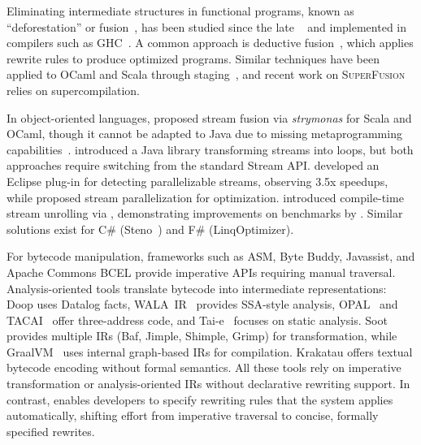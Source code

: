 
Eliminating intermediate structures in functional programs, known as ``deforestation'' or fusion~\citep{hirzel2014catalog}, has been studied since the late ~\citep{wadler1990deforestation} and implemented in compilers such as GHC~\citep{gill1993fusion}.
A common approach is deductive fusion~\citep{bird1989calculation,meijer1991bananas,chin1992fusion,takano1995deforestation,bird1997algebra,hamilton2002deforestation,coutts2007,hinze2011fusion}, which applies rewrite rules to produce optimized programs.
Similar techniques have been applied to OCaml and Scala through staging~\citep{kiselyov2017}, and recent work on \textsc{SuperFusion}~\citep{ji2024superfusion} relies on supercompilation.

In object-oriented languages, \citet{kiselyov2017} proposed stream fusion via \textit{strymonas} for Scala and OCaml, though it cannot be adapted to Java due to missing metaprogramming capabilities~\citep{kiselyov2024complete}.
\citet{ribeiro2018java} introduced a Java library transforming streams into loops, but both approaches require switching from the standard Stream API.
\citet{khatchadourian2020safe} developed an Eclipse plug-in for detecting parallelizable streams, observing 3.5x speedups, while \citet{basso2022optimizing} proposed stream parallelization for optimization.
\citet{moller2020eliminating} introduced compile-time stream unrolling via \streamliner{}, demonstrating improvements on benchmarks by \citet{biboudis2014clash}.
Similar solutions exist for C\# (Steno~\citep{murray2011steno}) and F\# (LinqOptimizer).

For bytecode manipulation, frameworks such as ASM, Byte Buddy, Javassist, and Apache Commons BCEL provide imperative APIs requiring manual traversal.
Analysis-orien\-ted tools translate bytecode into intermediate representations: Doop uses Datalog facts, WALA~IR~\citep{santos2022program} provides SSA-style analysis, OPAL~\citep{eichberg2014software} and TACAI~\citep{reif2020tacai} offer three-address code, and Tai-e~\citep{tian23tai} focuses on static analysis.
Soot~\citep{vallee1999soot} provides multiple IRs (Baf, Jimple, Shimple, Grimp) for transformation, while GraalVM~\citep{duboscq2013graal} uses internal graph-based IRs for compilation.
Krakatau offers textual bytecode encoding without formal semantics.
All these tools rely on imperative transformation or analysis-orien\-ted IRs without declarative rewriting support.
In contrast, \phino{} enables developers to specify rewriting rules that the system applies automatically, shifting effort from imperative traversal to concise, formally specified rewrites.
